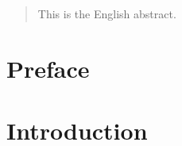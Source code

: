\cleardoublepage
{}
\thispagestyle{plain}


\begin{abstract}
  This is the English abstract.
\end{abstract}






\cleardoublepage
\thispagestyle{plain}
\chapter*{Preface}


\cleardoublepage
\pagestyle{fancy}
\tableofcontents 


\cleardoublepage

\chapter{Introduction}

\setcounter{page}{1}



\cleardoublepage
